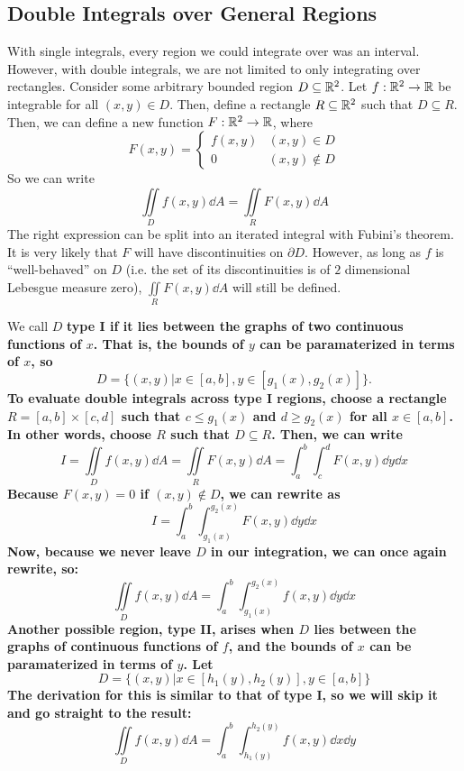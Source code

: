 \subsection{Double Integrals over General Regions}
With single integrals, every region we could integrate over was an interval. However, with double integrals, we are not limited to only integrating over rectangles. Consider some arbitrary bounded region \( D\subseteq \mathbb{R}^2 \). Let \( f: \mathbb{R}^2 \to \mathbb{R} \) be integrable for all \( (x,y) \in D \). Then, define a rectangle \( R\subseteq \mathbb{R}^2 \) such that \( D\subseteq R \). Then, we can define a new function \( F: \mathbb{R}^2 \to \mathbb{R} \), where
\[ F(x, y) = \begin{cases}
    f(x,y)& (x,y)\in D \\
    0 & (x,y)\notin D
\end{cases}\]
So we can write
\[ \iint\limits_Df(x,y)\dd A = \iint\limits_RF(x,y)\dd A \]
The right expression can be split into an iterated integral with Fubini's theorem. It is very likely that \( F \) will have discontinuities on \( \partial D \). However, as long as \( f \) is ``well-behaved'' on \( D\) (i.e. the set of its discontinuities is of $2$ dimensional Lebesgue measure zero), \( \iint\limits_RF(x,y)\dd A \) will still be defined. \par
We call \( D \) \bf{type I} if it lies between the graphs of two continuous functions of \( x \). That is, the bounds of \( y \) can be paramaterized in terms of \( x \), so
\[ D = \{(x,y)|x\in[a,b], y\in[g_1(x),g_2(x)]\}.\]
To evaluate double integrals across type I regions, choose a rectangle \( R=[a, b]\times[c,d] \) such that \( c \leq g_1(x) \) and \( d \geq g_2(x) \) for all \( x\in[a,b] \). In other words, choose \( R \) such that \( D\subseteq R \). Then, we can write 
\[ I = \iint\limits_Df(x,y)\dd A = \iint\limits_RF(x,y)\dd A = \int_a^b\int_c^dF(x,y)\dd y\dd x \]
Because \( F(x,y) = 0 \) if \( (x,y)\notin D \), we can rewrite as
\[ I = \int_a^b\int_{g_1(x)}^{g_2(x)}F(x,y)\dd y\dd x \]
Now, because we never leave \( D \) in our integration, we can once again rewrite, so:
\[ \iint\limits_Df(x,y)\dd A = \int_a^b\int_{g_1(x)}^{g_2(x)}f(x,y)\dd y\dd x \]
Another possible region, \bf{type II}, arises when \( D \) lies between the graphs of continuous functions of \( f \), and the bounds of \( x \) can be paramaterized in terms of \( y \). Let
\[ D = \{(x,y)|x\in[h_1(y), h_2(y)], y\in[a,b]\}\]
The derivation for this is similar to that of type I, so we will skip it and go straight to the result:
\[ \iint\limits_Df(x,y)\dd A = \int_a^b\int_{h_1(y)}^{h_2(y)}f(x,y)\dd x \dd y\]
